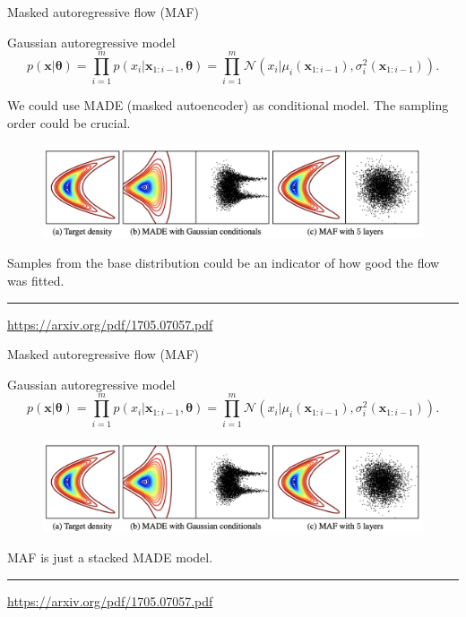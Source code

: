 \documentclass{beamer}
\newcommand{\bx}{\mathbf{x}}
\newcommand{\btheta}{\boldsymbol{\theta}}
\begin{document}
\begin{frame}{Masked autoregressive flow (MAF)}
	\begin{block}{Gaussian autoregressive model}
		\vspace{-0.5cm}
		\[
		p(\bx | \btheta) = \prod_{i=1}^m p(x_i | \bx_{1:i - 1}, \btheta) = \prod_{i=1}^m \mathcal{N} \left(x_i | \mu_i(\bx_{1:i-1}), \sigma^2_i (\bx_{1:i-1})\right).
		\]
		\vspace{-0.5cm}
	\end{block}
	We could use MADE (masked autoencoder) as conditional model. The sampling order could be crucial.
	\begin{figure}
		\includegraphics[width=\linewidth]{figs/maf1.png}
	\end{figure}
	Samples from the base distribution could be an indicator of how good the flow was fitted. \\
	\vfill
	\hrule\medskip
	{\scriptsize \href{https://arxiv.org/pdf/1705.07057.pdf}{https://arxiv.org/pdf/1705.07057.pdf}} 
\end{frame}
\begin{frame}{Masked autoregressive flow (MAF)}
	\begin{block}{Gaussian autoregressive model}
		\vspace{-0.5cm}
		\[
		p(\bx | \btheta) = \prod_{i=1}^m p(x_i | \bx_{1:i - 1}, \btheta) = \prod_{i=1}^m \mathcal{N} \left(x_i | \mu_i(\bx_{1:i-1}), \sigma^2_i (\bx_{1:i-1})\right).
		\]
		\vspace{-0.5cm}
	\end{block}
	\begin{figure}
		\includegraphics[width=\linewidth]{figs/maf1.png}
	\end{figure}
	MAF is just a stacked MADE model.
	\vfill
	\hrule\medskip
	{\scriptsize \href{https://arxiv.org/pdf/1705.07057.pdf}{https://arxiv.org/pdf/1705.07057.pdf}} 
\end{frame}
\end{document}
